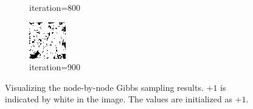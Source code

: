 \documentclass{article}
\begin{document}
\begin{figure}[h]
\begin{subfigure}[t]{0.18\textwidth}
\vspace{-0.6cm}
\caption{iteration=800}
\end{subfigure}\hspace{0.01\textwidth}
\begin{subfigure}[t]{0.18\textwidth}
\centering
\includegraphics[width=\textwidth]{./computational/results/gibbs_node_sampler_positive_iter_900.png}
\vspace{-0.6cm}
\caption{iteration=900}
\end{subfigure}\hspace{0.01\textwidth}
\caption{Visualizing the node-by-node Gibbs sampling results. $+1$ is indicated by white in the image. The values are initialized as $+1$.}
\label{f:63a}
\end{figure}
%
\end{document}
